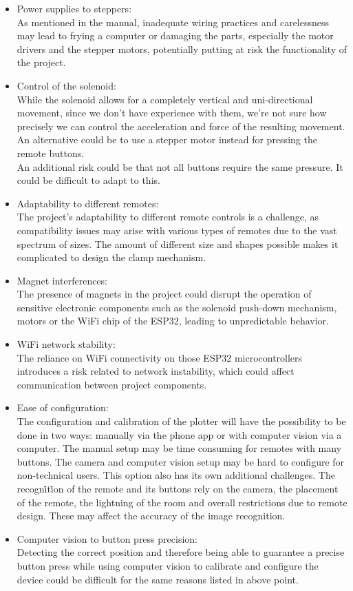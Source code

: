 \begin{itemize}
    \item Power supplies to steppers:\\
        As mentioned in the manual, inadequate wiring practices and carelessness may lead to frying a computer or damaging the parts, especially the motor drivers and the stepper motors, potentially putting at risk the functionality of the project.
    \item Control of the solenoid:\\
        While the solenoid allows for a completely vertical and uni-directional movement, since we don't have experience with them, we're not sure how precisely we can control the acceleration and force of the resulting movement.
        An alternative could be to use a stepper motor instead for pressing the remote buttons.\\
        An additional risk could be that not all buttons require the same pressure. It could be difficult to adapt to this.
    \item Adaptability to different remotes:\\
        The project's adaptability to different remote controls is a challenge, as compatibility issues may arise with various types of remotes due to the vast spectrum of sizes. The amount of different size and shapes possible makes it complicated to design the clamp mechanism. 
    \item Magnet interferences:\\
        The presence of magnets in the project could disrupt the operation of sensitive electronic components such as the solenoid push-down mechanism, motors or the WiFi chip of the ESP32, leading to unpredictable behavior.
    \item WiFi network stability:\\
        The reliance on WiFi connectivity on those ESP32 microcontrollers introduces a risk related to network instability, which could affect communication between project components.
    \item Ease of configuration:\\
        The configuration and calibration of the plotter will have the possibility to be done in two ways: manually via the phone app or with computer vision via a computer. The manual setup may be time consuming for remotes with many buttons. 
        The camera and computer vision setup may be hard to configure for non-technical users. This option also has its own additional challenges. The recogni̇ti̇on of the remote and its buttons rely on the camera, the placement of the remote, the lightning of the room
        and overall restrictions due to remote design. These may affect the accuracy of the image recognition.
    \item Computer vision to button press precision:\\
        Detecting the correct position and therefore being able to guarantee a precise button press while using computer vision to calibrate and configure the device could be difficult for the same reasons listed in above point.
\end{itemize}
